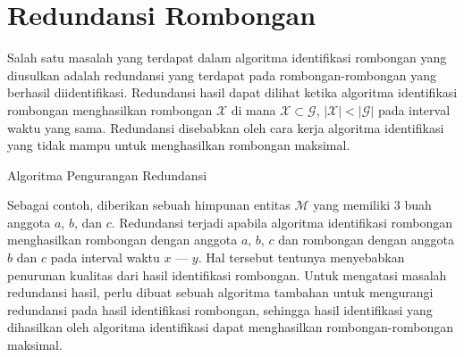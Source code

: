 \section{Redundansi Rombongan}
\label{sec:redundancy}

Salah satu masalah yang terdapat dalam algoritma identifikasi rombongan yang diusulkan adalah redundansi yang terdapat pada rombongan-rombongan yang berhasil diidentifikasi. Redundansi hasil dapat dilihat ketika algoritma identifikasi rombongan menghasilkan rombongan $\mathcal{X}$ di mana $\mathcal{X} \subset \mathcal{G}$, $|\mathcal{X}| < |\mathcal{G}|$ pada interval waktu yang sama. Redundansi disebabkan oleh cara kerja algoritma identifikasi yang tidak mampu untuk menghasilkan rombongan maksimal.

\begin{algorithm}[h]
    \caption{Algoritma Pengurangan Redundansi}
    \DontPrintSemicolon
    
    \label{bab3:redundansi}
    
 
  
    
\end{algorithm}

Sebagai contoh, diberikan sebuah himpunan entitas $\mathcal{M}$ yang memiliki 3 buah anggota $a$, $b$, dan $c$. Redundansi terjadi apabila algoritma identifikasi rombongan menghasilkan rombongan dengan anggota $a$, $b$, $c$ dan rombongan dengan anggota $b$ dan $c$ pada interval waktu $x$ --- $y$. Hal tersebut tentunya menyebabkan penurunan kualitas dari hasil identifikasi rombongan. Untuk mengatasi masalah redundansi hasil, perlu dibuat sebuah algoritma tambahan untuk mengurangi redundansi pada hasil identifikasi rombongan, sehingga hasil identifikasi yang dihasilkan oleh algoritma identifikasi dapat menghasilkan rombongan-rombongan maksimal.

